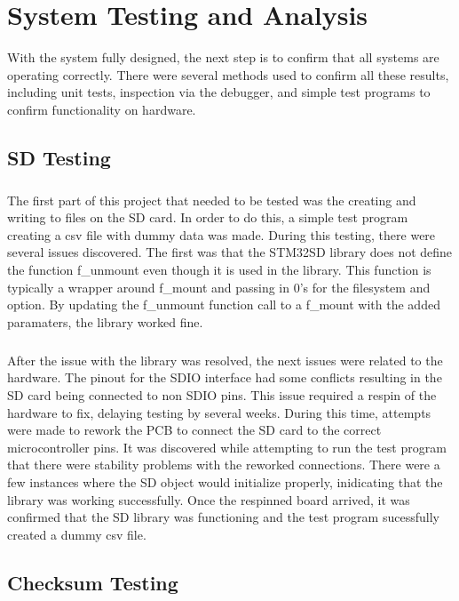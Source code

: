 \chapter{System Testing and Analysis}
With the system fully designed, the next step is to confirm that all systems are operating correctly.
There were several methods used to confirm all these results, including unit tests, inspection via the debugger, and simple test programs to confirm functionality on hardware.

\section{SD Testing}

\paragraph{}
The first part of this project that needed to be tested was the creating and writing to files on the SD card.
In order to do this, a simple test program creating a csv file with dummy data was made.
During this testing, there were several issues discovered.
The first was that the STM32SD library does not define the function f\_unmount even though it is used in the library.
This function is typically a wrapper around f\_mount and passing in 0's for the filesystem and option.
By updating the f\_unmount function call to a f\_mount with the added paramaters, the library worked fine.

\paragraph{}
After the issue with the library was resolved, the next issues were related to the hardware.
The pinout for the SDIO interface had some conflicts resulting in the SD card being connected to non SDIO pins.
This issue required a respin of the hardware to fix, delaying testing by several weeks.
During this time, attempts were made to rework the PCB to connect the SD card to the correct microcontroller pins.
It was discovered while attempting to run the test program that there were stability problems with the reworked connections.
There were a few instances where the SD object would initialize properly, inidicating that the library was working successfully.
Once the respinned board arrived, it was confirmed that the SD library was functioning and the test program sucessfully created a dummy csv file.

\section{Checksum Testing}


